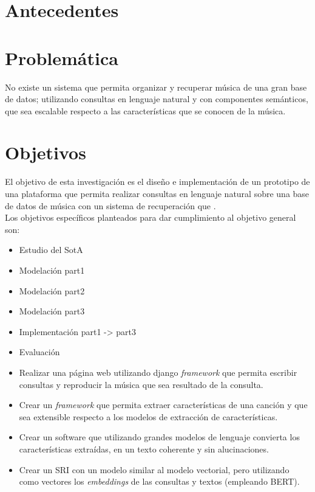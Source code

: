 \section{Antecedentes}
\section{Problemática}
No existe un sistema que permita organizar y recuperar música de una gran base de datos; utilizando consultas en lenguaje natural y con componentes semánticos, que sea escalable respecto a las características que se conocen de la música. \\
\section{Objetivos}
El objetivo de esta investigación es el diseño e implementación de un prototipo de una plataforma que permita realizar consultas en lenguaje natural sobre una base de datos de música con un sistema de recuperación que .\\
Los objetivos específicos planteados para dar cumplimiento al objetivo general son:
\begin{itemize}
    \item Estudio del SotA
    \item Modelación part1
    \item Modelación part2
    \item Modelación part3
    \item Implementación part1 -> part3
    \item Evaluación %
    \item Realizar una página web utilizando django \textit{framework} que permita escribir consultas y reproducir la música que sea resultado de la consulta.
    \item Crear un \textit{framework} que permita extraer características de una canción y que sea extensible respecto a los modelos de extracción de características.
    \item Crear un software que utilizando grandes modelos de lenguaje convierta los características extraídas, en un texto coherente y sin alucinaciones. 
    \item Crear un SRI con un modelo similar al modelo vectorial, pero utilizando como vectores los \textit{embeddings} de las consultas y textos (empleando BERT).
\end{itemize}\\

